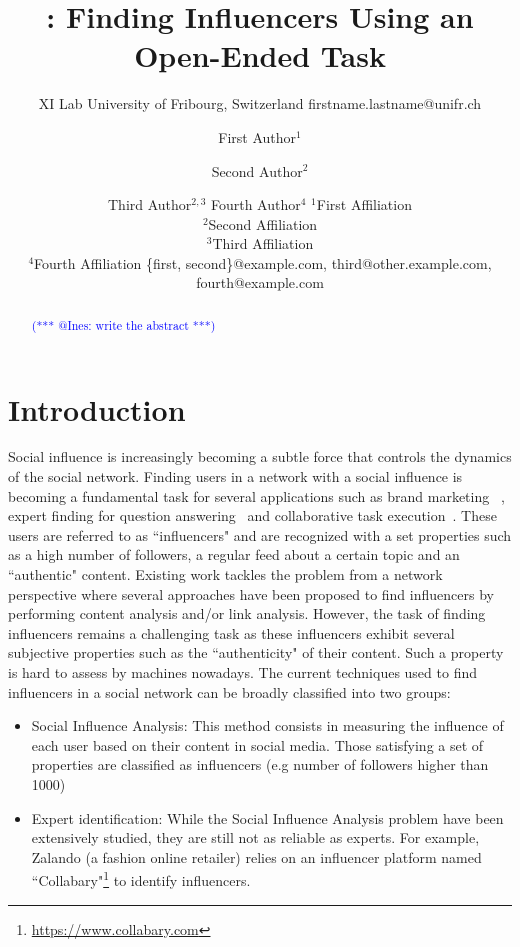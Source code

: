 \documentclass{article}
\title{\sys: Finding Influencers Using an Open-Ended Task}
\author{
    XI Lab
    \affiliations
    University of Fribourg, Switzerland\emails
    firstname.lastname@unifr.ch
}
\author{
First Author$^1$
\and
Second Author$^2$\and
Third Author$^{2,3}$\And
Fourth Author$^4$
\affiliations
$^1$First Affiliation\\
$^2$Second Affiliation\\
$^3$Third Affiliation\\
$^4$Fourth Affiliation
\emails
\{first, second\}@example.com,
third@other.example.com,
fourth@example.com
}
\makeatletter
\newcommand{\iar}[1]{\textcolor{blue}{(*** @Ines: #1 ***)}}
\makeatother
\begin{document}
\maketitle

\begin{abstract}
\iar{write the abstract}
\end{abstract}

\section{Introduction}
Social influence is increasingly becoming a subtle force that controls the dynamics of the social network. 
Finding users in a network with a social influence is becoming a fundamental 
task for several applications such as brand marketing
~\cite{bond201261,richardson2002mining,van2007new}, expert finding for question 
answering~\cite{riahi2012finding} and collaborative task execution~\cite{sun2014analyzing,miao2010generative}. These users are referred to as ``influencers"
and are recognized with a set properties such as a high number of 
followers, a regular feed about a certain topic and an ``authentic" content.
 Existing work tackles the problem from a network perspective where 
 several approaches have been proposed to find influencers by performing content analysis and/or link analysis. However, the task of finding influencers remains a challenging task as these influencers
exhibit several subjective properties such as the ``authenticity" of their
content. Such a property is hard to assess by machines nowadays.
The current techniques used to find influencers in a social network
can be broadly classified into two groups:
\begin{itemize}
\item Social Influence Analysis: This method consists in measuring the influence of each user 
based on their content in social media.
Those satisfying a set of properties are classified as influencers (e.g 
number of followers higher than 1000)
\cite{Cheng2014,Lehmann2013}
 
\item Expert identification: While the Social Influence Analysis
problem have been extensively studied, they are still not as reliable
as experts. For example, Zalando (a fashion online retailer)
relies on an influencer platform named ``Collabary"\footnote{\url{https://www.collabary.com}} to identify influencers.
\end{itemize}
\end{document}
